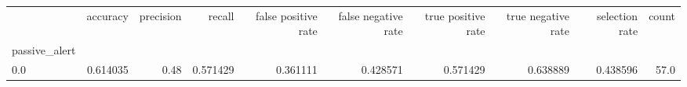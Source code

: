 \begin{tabular}{lrrrrrrrrr}
\toprule
{} &  accuracy &  precision &    recall &  false positive rate &  false negative rate &  true positive rate &  true negative rate &  selection rate &  count \\
passive\_alert &           &            &           &                      &                      &                     &                     &                 &        \\
\midrule
0.0           &  0.614035 &       0.48 &  0.571429 &             0.361111 &             0.428571 &            0.571429 &            0.638889 &        0.438596 &   57.0 \\
\bottomrule
\end{tabular}
